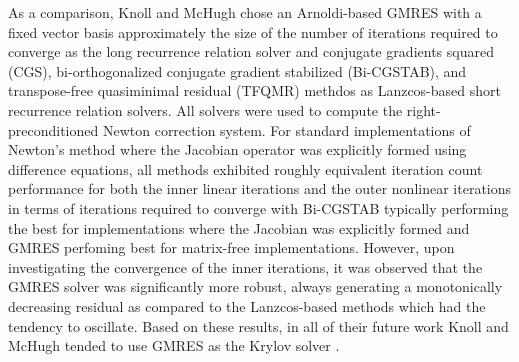As a comparison, Knoll and McHugh chose an Arnoldi-based GMRES with a
fixed vector basis approximately the size of the number of iterations
required to converge as the long recurrence relation solver and
conjugate gradients squared (CGS), bi-orthogonalized conjugate
gradient stabilized (Bi-CGSTAB), and transpose-free quasiminimal
residual (TFQMR) methdos as Lanzcos-based short recurrence relation
solvers. All solvers were used to compute the right-preconditioned
Newton correction system. For standard implementations of Newton's
method where the Jacobian operator was explicitly formed using
difference equations, all methods exhibited roughly equivalent
iteration count performance for both the inner linear iterations and
the outer nonlinear iterations in terms of iterations required to
converge with Bi-CGSTAB typically performing the best for
implementations where the Jacobian was explicitly formed and GMRES
perfoming best for matrix-free implementations. However, upon
investigating the convergence of the inner iterations, it was observed
that the GMRES solver was significantly more robust, always generating
a monotonically decreasing residual as compared to the Lanzcos-based
methods which had the tendency to oscillate. Based on these results,
in all of their future work Knoll and McHugh tended to use GMRES as
the Krylov solver \citep{knoll_jacobian-free_2004}.

